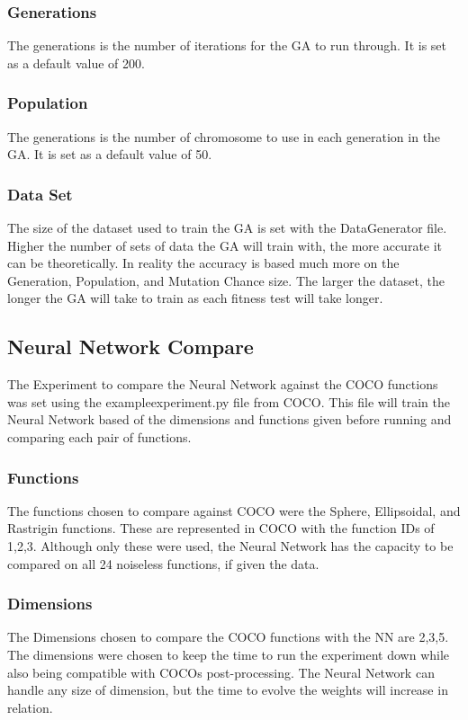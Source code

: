 \documentclass[12pt]{article}
\begin{document}
\subsubsection{Generations}
The generations is the number of iterations for the GA to run through. It is set as a default value of 200.

\subsubsection{Population}
The generations is the number of chromosome to use in each generation in the GA. It is set as a default value of 50.

\subsubsection{Data Set}
The size of the dataset used to train the GA is set with the DataGenerator file. Higher the number of sets of data the GA will train with, the more accurate it can be theoretically. In reality the accuracy is based much more on the Generation, Population, and Mutation Chance size. The larger the dataset, the longer the GA will take to train as each fitness test will take longer.

\subsection{Neural Network Compare}
The Experiment to compare the Neural Network against the COCO functions was set using the exampleexperiment.py file from COCO. This file will train the Neural Network based of the dimensions and functions given before running and comparing each pair of functions.

\subsubsection{Functions}
The functions chosen to compare against COCO were the Sphere, Ellipsoidal, and Rastrigin functions. These are represented in COCO with the function IDs of 1,2,3. Although only these were used, the Neural Network has the capacity to be compared on all 24 noiseless functions, if given the data.

\subsubsection{Dimensions}
The Dimensions chosen to compare the COCO functions with the NN are 2,3,5. The dimensions were chosen to keep the time to run the experiment down while also being compatible with COCOs post-processing. The Neural Network can handle any size of dimension, but the time to evolve the weights will increase in relation.
\end{document}

